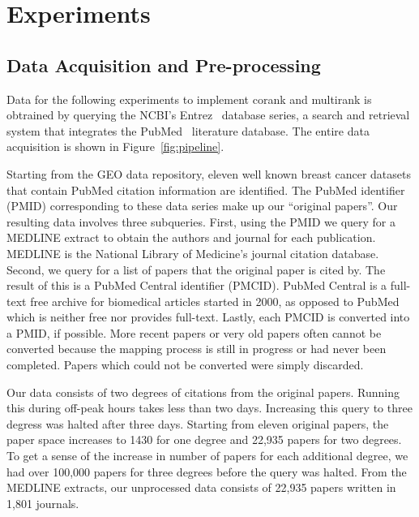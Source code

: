 \section{Experiments}
\subsection{Data Acquisition and Pre-processing}
Data for the following experiments to implement corank and multirank is obtrained by querying the NCBI's Entrez~\cite{maglott2005entrez} database series, a search and retrieval system that integrates the PubMed~\cite{pubmed} literature database. The entire data acquisition is shown in Figure~\ref{fig:pipeline}.

Starting from the GEO data repository, eleven well known breast cancer datasets that contain PubMed citation information are identified. The PubMed identifier (PMID) corresponding to these data series make up our ``original papers''. Our resulting data involves three subqueries. First, using the PMID we query for a MEDLINE extract to obtain the authors and journal for each publication. MEDLINE is the National Library of Medicine's journal citation database. Second, we query for a list of papers that the original paper is cited by. The result of this is a PubMed Central identifier (PMCID). PubMed Central is a full-text free archive for biomedical articles started in 2000, as opposed to PubMed which is neither free nor provides full-text. Lastly, each PMCID is converted into a PMID, if possible. More recent papers or very old papers often cannot be converted because the mapping process is still in progress or had never been completed. Papers which could not be converted were simply discarded. 

Our data consists of two degrees of citations from the original papers. Running this during off-peak hours takes less than two days. Increasing this query to three degress was halted after three days. Starting from eleven original papers, the paper space increases to 1430 for one degree and 22,935 papers for two degrees. To get a sense of the increase in number of papers for each additional degree, we had over 100,000 papers for three degrees before the query was halted. From the MEDLINE extracts, our unprocessed data consists of 22,935 papers written in 1,801 journals.

